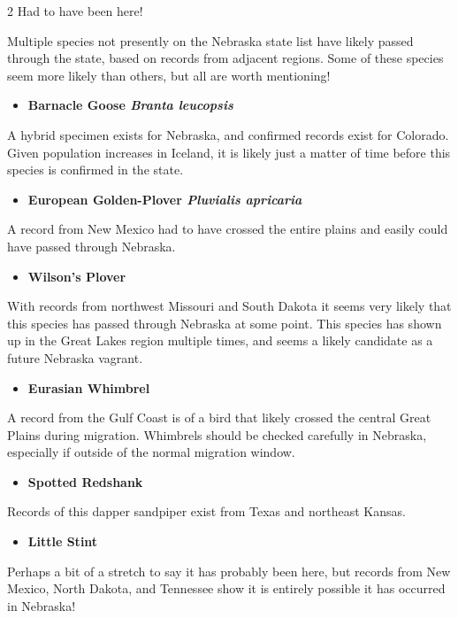 \documentclass[10pt,letterpaper]{article}
\newcommand{\NewsItem}[1]{%
		\fontspec{QTBrushStroke}
		\large #1 \vspace{4pt}
		\par \normalsize \normalfont}
\begin{document}
\begin{multicols}{2}
	\noindent \NewsItem{Had to have been here!}
	\noindent Multiple species not presently on the Nebraska state list have likely passed through the state, based on records from adjacent regions. Some of these species seem more likely than others, but all are worth mentioning!
	\begin{itemize}
		\item \textbf{Barnacle Goose \textit{Branta leucopsis}}
	\end{itemize}
	A hybrid specimen exists for Nebraska, and confirmed records exist for Colorado. Given population increases in Iceland, it is likely just a matter of time before this species is confirmed in the state.
	
	\begin{itemize}
		\item \textbf{European Golden-Plover \textit{Pluvialis apricaria}}
	\end{itemize}
	A record from New Mexico had to have crossed the entire plains and easily could have passed through Nebraska.
	
	\begin{itemize}
		\item \textbf{Wilson’s Plover}
	\end{itemize}
	With records from northwest Missouri and South Dakota it seems very likely that this species has passed through Nebraska at some point. This species has shown up in the Great Lakes region multiple times, and seems a likely candidate as a future Nebraska vagrant.
	
	\begin{itemize}
		\item \textbf{Eurasian Whimbrel}
	\end{itemize}
	A record from the Gulf Coast is of a bird that likely crossed the central Great Plains during migration. Whimbrels should be checked carefully in Nebraska, especially if outside of the normal migration window.
	
	\begin{itemize}
		\item \textbf{Spotted Redshank}
	\end{itemize}
	Records of this dapper sandpiper exist from Texas and northeast Kansas.
	
	\begin{itemize}
		\item \textbf{Little Stint}
	\end{itemize}
	Perhaps a bit of a stretch to say it has probably been here, but records from New Mexico, North Dakota, and Tennessee show it is entirely possible it has occurred in Nebraska!
	

\end{multicols}
\end{document}
